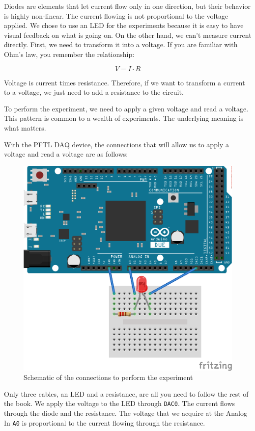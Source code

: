 Diodes are elements that let current flow only in one direction, but their behavior is highly non-linear. The current flowing is not proportional to the voltage applied. We chose to use an LED for the experiments because it is easy to have visual feedback on what is going on. On the other hand, we can't measure current directly. First, we need to transform it into a voltage. If you are familiar with Ohm's law, you remember the relationship:

\begin{equation}
V = I \cdot R
\end{equation}

Voltage is current times resistance. Therefore, if we want to transform a current to a voltage, we just need to add a resistance to the circuit.

To perform the experiment, we need to apply a given voltage and read a  voltage. This pattern is common to a wealth of experiments. The underlying meaning is what matters.

With the {PFTL DAQ} device, the connections that will allow us to apply a voltage and read a voltage are as follows:

\begin{figure}
\includegraphics[width=.5\textwidth]{images/Chapter_03/IV_scheme_bb.png}
\caption{Schematic of the connections to perform the experiment}
\end{figure}

Only three cables, an LED and a resistance, are all you need to follow the rest of the book. We apply the voltage to the LED through \texttt{DAC0}. The current flows through the diode and the resistance. The voltage that we acquire at the Analog In \texttt{A0} is proportional to the current flowing through the resistance.



